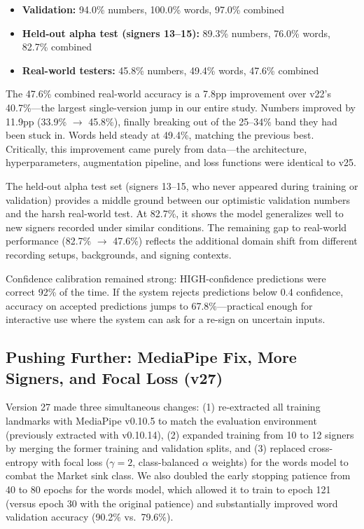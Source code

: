 \documentclass[conference]{IEEEtran}
\begin{document}
\begin{itemize}
    \item \textbf{Validation:} 94.0\% numbers, 100.0\% words, 97.0\% combined
    \item \textbf{Held-out alpha test (signers 13--15):} 89.3\% numbers, 76.0\% words, 82.7\% combined
    \item \textbf{Real-world testers:} 45.8\% numbers, 49.4\% words, 47.6\% combined
\end{itemize}

The 47.6\% combined real-world accuracy is a 7.8pp improvement over v22's 40.7\%---the largest single-version jump in our entire study. Numbers improved by 11.9pp (33.9\% $\to$ 45.8\%), finally breaking out of the 25--34\% band they had been stuck in. Words held steady at 49.4\%, matching the previous best. Critically, this improvement came purely from data---the architecture, hyperparameters, augmentation pipeline, and loss functions were identical to v25.

The held-out alpha test set (signers 13--15, who never appeared during training or validation) provides a middle ground between our optimistic validation numbers and the harsh real-world test. At 82.7\%, it shows the model generalizes well to new signers recorded under similar conditions. The remaining gap to real-world performance (82.7\% $\to$ 47.6\%) reflects the additional domain shift from different recording setups, backgrounds, and signing contexts.

Confidence calibration remained strong: HIGH-confidence predictions were correct 92\% of the time. If the system rejects predictions below 0.4 confidence, accuracy on accepted predictions jumps to 67.8\%---practical enough for interactive use where the system can ask for a re-sign on uncertain inputs.

\subsection{Pushing Further: MediaPipe Fix, More Signers, and Focal Loss (v27)}
\label{sec:v27}

Version 27 made three simultaneous changes: (1) re-extracted all training landmarks with MediaPipe v0.10.5 to match the evaluation environment (previously extracted with v0.10.14), (2) expanded training from 10 to 12 signers by merging the former training and validation splits, and (3) replaced cross-entropy with focal loss ($\gamma = 2$, class-balanced $\alpha$ weights) for the words model to combat the Market sink class. We also doubled the early stopping patience from 40 to 80 epochs for the words model, which allowed it to train to epoch 121 (versus epoch 30 with the original patience) and substantially improved word validation accuracy (90.2\% vs.\ 79.6\%).
\end{document}
